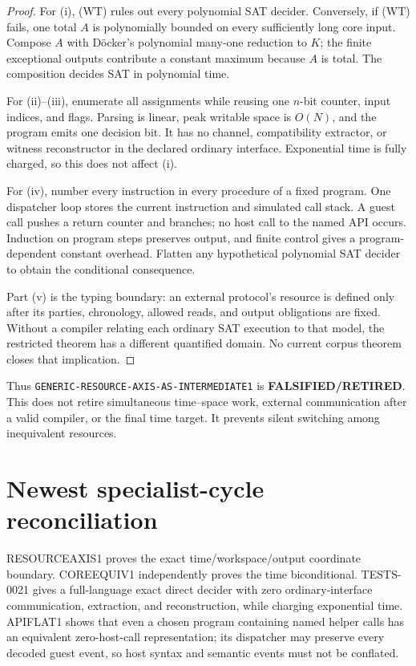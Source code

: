 \documentclass[11pt]{article}
\newcommand{\RETIRED}{\textbf{FALSIFIED/RETIRED}}
\begin{document}
\begin{proof}
For (i), (WT) rules out every polynomial SAT decider.  Conversely, if (WT)
fails, one total $A$ is polynomially bounded on every sufficiently long core
input.  Compose $A$ with D\"ocker's polynomial many-one reduction to $K$;
the finite exceptional outputs contribute a constant maximum because $A$ is
total.  The composition decides SAT in polynomial time.

For (ii)--(iii), enumerate all assignments while reusing one $n$-bit counter,
input indices, and flags.  Parsing is linear, peak writable space is $O(N)$,
and the program emits one decision bit.  It has no channel, compatibility
extractor, or witness reconstructor in the declared ordinary interface.
Exponential time is fully charged, so this does not affect (i).

For (iv), number every instruction in every procedure of a fixed program.
One dispatcher loop stores the current instruction and simulated call stack.
A guest call pushes a return counter and branches; no host call to the named
API occurs.  Induction on program steps preserves output, and finite control
gives a program-dependent constant overhead.  Flatten any hypothetical
polynomial SAT decider to obtain the conditional consequence.

Part (v) is the typing boundary: an external protocol's resource is defined
only after its parties, chronology, allowed reads, and output obligations are
fixed.  Without a compiler relating each ordinary SAT execution to that
model, the restricted theorem has a different quantified domain.  No current
corpus theorem closes that implication.
\end{proof}

Thus \texttt{GENERIC-RESOURCE-AXIS-AS-INTERMEDIATE1} is \RETIRED.  This does
not retire simultaneous time--space work, external communication after a
valid compiler, or the final time target.  It prevents silent switching among
inequivalent resources.

\section{Newest specialist-cycle reconciliation}
RESOURCEAXIS1 proves the exact time/workspace/output coordinate boundary.
COREEQUIV1 independently proves the time biconditional.  TESTS-0021 gives a
full-language exact direct decider with zero ordinary-interface communication,
extraction, and reconstruction, while charging exponential time.  APIFLAT1
shows that even a chosen program containing named helper calls has an
equivalent zero-host-call representation; its dispatcher may preserve every
decoded guest event, so host syntax and semantic events must not be conflated.
\end{document}

